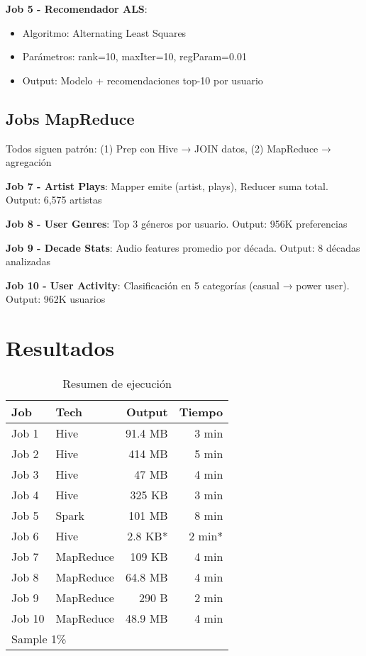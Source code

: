 \documentclass[11pt,a4paper]{article}
\begin{document}
\textbf{Job 5 - Recomendador ALS}:
\begin{itemize}
    \item Algoritmo: Alternating Least Squares
    \item Parámetros: rank=10, maxIter=10, regParam=0.01
    \item Output: Modelo + recomendaciones top-10 por usuario
\end{itemize}

\subsection{Jobs MapReduce}

Todos siguen patrón: (1) Prep con Hive → JOIN datos, (2) MapReduce → agregación

\textbf{Job 7 - Artist Plays}: Mapper emite (artist, plays), Reducer suma total. Output: 6,575 artistas

\textbf{Job 8 - User Genres}: Top 3 géneros por usuario. Output: 956K preferencias

\textbf{Job 9 - Decade Stats}: Audio features promedio por década. Output: 8 décadas analizadas

\textbf{Job 10 - User Activity}: Clasificación en 5 categorías (casual → power user). Output: 962K usuarios

\section{Resultados}

\begin{table}[h]
\centering
\caption{Resumen de ejecución}
\small
\begin{tabular}{@{}llrr@{}}
\toprule
\textbf{Job} & \textbf{Tech} & \textbf{Output} & \textbf{Tiempo} \\ \midrule
Job 1 & Hive & 91.4 MB & 3 min \\
Job 2 & Hive & 414 MB & 5 min \\
Job 3 & Hive & 47 MB & 4 min \\
Job 4 & Hive & 325 KB & 3 min \\
Job 5 & Spark & 101 MB & 8 min \\
Job 6 & Hive & 2.8 KB* & 2 min* \\
Job 7 & MapReduce & 109 KB & 4 min \\
Job 8 & MapReduce & 64.8 MB & 4 min \\
Job 9 & MapReduce & 290 B & 2 min \\
Job 10 & MapReduce & 48.9 MB & 4 min \\ \bottomrule
\multicolumn{4}{l}{\footnotesize * Sample 1\%}
\end{tabular}
\end{table}
\end{document}
